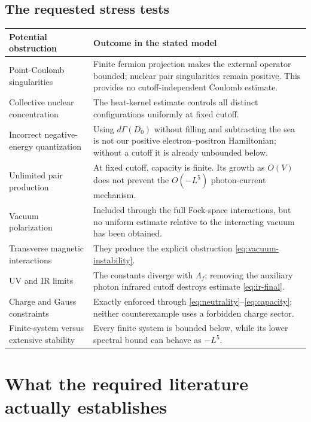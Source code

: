 \clearpage
\subsection{The requested stress tests}
\small
\noindent
\begin{tabular}{@{}>{\raggedright\arraybackslash}p{}>{\raggedright\arraybackslash}p{}@{}}
\toprule
Potential obstruction & Outcome in the stated model\\
\midrule
Point-Coulomb singularities &
Finite fermion projection makes the external operator bounded; nuclear
pair singularities remain positive. This provides no cutoff-independent
Coulomb estimate.\\[0.6em]
Collective nuclear concentration &
The heat-kernel estimate controls all distinct configurations uniformly
at fixed cutoff.\\[0.6em]
Incorrect negative-energy quantization &
Using \(d\Gamma(D_0)\) without filling and subtracting the sea is not our
positive electron--positron Hamiltonian; without a cutoff it is already
unbounded below.\\[0.6em]
Unlimited pair production &
At fixed cutoff, capacity is finite. Its growth as \(O(V)\) does not prevent
the \(O(-L^5)\) photon-current mechanism.\\[0.6em]
Vacuum polarization &
Included through the full Fock-space interactions, but no uniform estimate
relative to the interacting vacuum has been obtained.\\[0.6em]
Transverse magnetic interactions &
They produce the explicit obstruction \eqref{eq:vacuum-instability}.\\[0.6em]
UV and IR limits &
The constants diverge with \(\Lambda_f\); removing the auxiliary photon
infrared cutoff destroys estimate \eqref{eq:ir-final}.\\[0.6em]
Charge and Gauss constraints &
Exactly enforced through \eqref{eq:neutrality}--\eqref{eq:capacity};
neither counterexample uses a forbidden charge sector.\\[0.6em]
Finite-system versus extensive stability &
Every finite system is bounded below, while its lower spectral bound can
behave as \(-L^5\).\\
\bottomrule
\end{tabular}
\normalsize

\section{What the required literature actually establishes}
\label{sec:literature}
